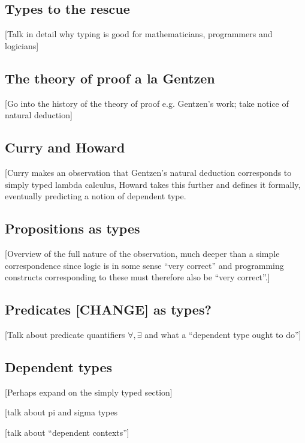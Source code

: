 \subsection{Types to the rescue}

[Talk in detail why typing is good for mathematicians, programmers and logicians]

\subsection{The theory of proof a la Gentzen}

[Go into the history of the theory of proof e.g. Gentzen's work; take notice of natural deduction]

\subsection{Curry and Howard}

[Curry makes an observation that Gentzen's natural deduction corresponds to simply typed lambda calculus, Howard takes this further and defines it formally, eventually predicting a notion of dependent type.

\subsection{Propositions as types}

[Overview of the full nature of the observation, much deeper than a simple correspondence since logic is in some sense ``very correct'' and programming constructs corresponding to these must therefore also be ``very correct''.]

\subsection{Predicates [CHANGE] as types?}

[Talk about predicate quantifiers $\forall, \exists$ and what a ``dependent type ought to do'']

\subsection{Dependent types}


[Perhaps expand on the simply typed section]

[talk about pi and sigma types

[talk about ``dependent contexts'']


